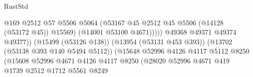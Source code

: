 \begin{lexlean}{RustStd}
\begin{coremodule}
                                                            @169
                                                            @2512
                                                            @57
                                                            @5506
                                                            @5064
                                                            (@53167
                                                              @45
                                                              @2512
                                                              @45
                                                              @5506
                                                              (@14128 (@53172 @45))
                                                              @15569)
                                                            (@14001 @53100 @4671)))))
                                                    @49368
                                                    @49371
                                                    @49374
                                                    @49377))
                                                (@15499 (@53126 @138))
                                                (@13954 (@53131 @453 @393))
                                                (@13702 (@53138 @393 @140 @5494 @5112))
                                                (@15648
                                                  @52996
                                                  @4126
                                                  @4117
                                                  @5112
                                                  @8250
                                                  (@15608
                                                    @52996
                                                    @4671
                                                    @4126
                                                    @4117
                                                    @8250
                                                    (@28020
                                                      @52996
                                                      @4671
                                                      @419
                                                      @1739
                                                      @2512
                                                      @1712
                                                      @5561
                                                      @8249

\end{coremodule}
\end{lexlean}
